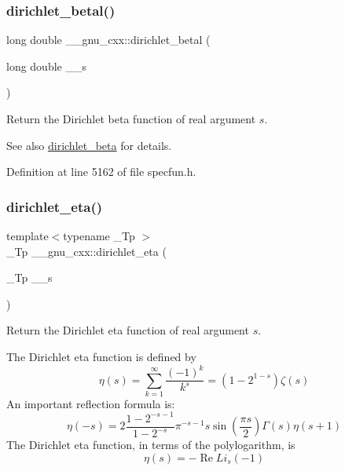 \subsubsection{\texorpdfstring{dirichlet\+\_\+betal()}{dirichlet\_betal()}}
{\footnotesize\ttfamily long double \+\_\+\+\_\+gnu\+\_\+cxx\+::dirichlet\+\_\+betal (\begin{DoxyParamCaption}\item[{long double}]{\+\_\+\+\_\+s }\end{DoxyParamCaption})\hspace{0.3cm}{\ttfamily [inline]}}

Return the Dirichlet beta function of real argument $ s $.

\begin{DoxySeeAlso}{See also}
\hyperlink{group__gnu__math__spec__func_ga87466a2d429a2815d794acc21c882b08}{dirichlet\+\_\+beta} for details. 
\end{DoxySeeAlso}


Definition at line 5162 of file specfun.\+h.

\mbox{\label{group__gnu__math__spec__func_gae46e26e4107675d285c79a2d6202e6c7}} 
\subsubsection{\texorpdfstring{dirichlet\+\_\+eta()}{dirichlet\_eta()}}
{\footnotesize\ttfamily template$<$typename \+\_\+\+Tp $>$ \\
\+\_\+\+Tp \+\_\+\+\_\+gnu\+\_\+cxx\+::dirichlet\+\_\+eta (\begin{DoxyParamCaption}\item[{\+\_\+\+Tp}]{\+\_\+\+\_\+s }\end{DoxyParamCaption})\hspace{0.3cm}{\ttfamily [inline]}}

Return the Dirichlet eta function of real argument $ s $.

The Dirichlet eta function is defined by \[ \eta(s) = \sum_{k=1}^\infty \frac{(-1)^k}{k^s} = \left( 1 - 2^{1-s} \right) \zeta(s) \] An important reflection formula is\+: \[ \eta(-s) = 2 \frac{1-2^{-s-1}}{1-2^{-s}} \pi^{-s-1} s \sin(\frac{\pi s}{2}) \Gamma(s) \eta(s+1) \] The Dirichlet eta function, in terms of the polylogarithm, is \[ \renewcommand\Re{\operatorname{Re}} \renewcommand\Im{\operatorname{Im}} \eta(s) = -\Re{Li_s(-1)} \]


